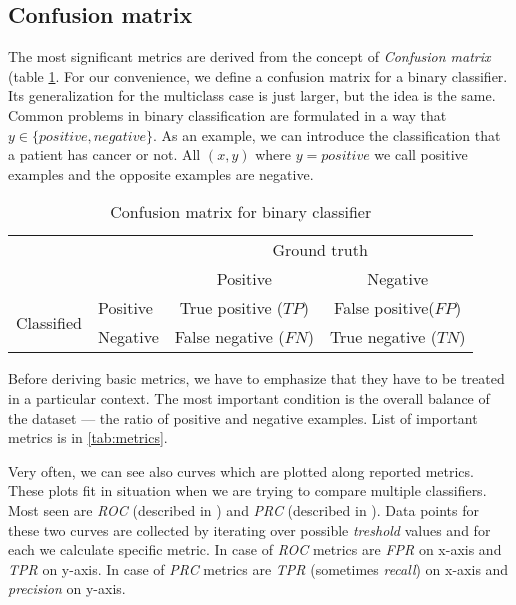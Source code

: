 \subsection*{Confusion matrix}
The most significant metrics are derived from the concept of \emph{Confusion matrix} (table \ref{tab:confmatrix}. For our convenience, we define a confusion matrix for a binary classifier. Its generalization for the multiclass case is just larger, but the idea is the same. Common problems in binary classification are formulated in a way that $y \in \{positive, negative\}$. As an example, we can introduce the classification that a patient has cancer or not. All $(x,y)$ where $y=positive$ we call positive examples and the opposite examples are negative.

\begin{table}[h]
    \centering
    \caption{Confusion matrix for binary classifier}
        \begin{tabular}{l|l|c|c|}
        \multicolumn{2}{c}{}&\multicolumn{2}{c}{Ground truth}\\
        \cline{3-4}
        \multicolumn{2}{c|}{}&Positive&Negative\\
        \cline{2-4}
        \multirow{2}{*}{Classified}& Positive & True positive ($TP$) & False positive($FP$)\\
        \cline{2-4}
        & Negative & False negative ($FN$) & True negative ($TN$)\\
        \cline{2-4}
        \end{tabular}
    \label{tab:confmatrix}
  \end{table}

Before deriving basic metrics, we have to emphasize that they have to be treated in a particular context. The most important condition is the overall balance of the dataset --- the ratio of positive and negative examples. List of important metrics is in \ref{tab:metrics}.

Very often, we can see also curves which are plotted along reported metrics. These plots fit in situation when we are trying to compare multiple classifiers. Most seen are \emph{ROC} (described in \cite{Fawcett2006}) and \emph{PRC} (described in \cite{Flach2015}). Data points for these two curves are collected by iterating over possible \emph{treshold} values and for each we calculate specific metric. In case of \emph{ROC} metrics are \emph{FPR} on x-axis and \emph{TPR} on y-axis. In case of \emph{PRC} metrics are \emph{TPR} (sometimes \emph{recall}) on x-axis and \emph{precision} on y-axis.

